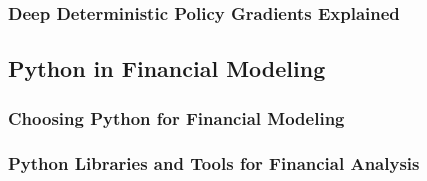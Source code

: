 \subsubsection{Deep Deterministic Policy Gradients Explained}

\subsection{Python in Financial Modeling}

\subsubsection{Choosing Python for Financial Modeling}

\subsubsection{Python Libraries and Tools for Financial Analysis}
